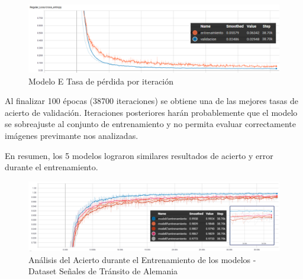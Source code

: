 			\begin{figure}[H]
				\begin{center}
				\includegraphics[width=1\textwidth]{images/desarrollo/trainResults/german/model7Loss} 
				\end{center}
				\begin{center}
				\caption{\small{Modelo E Tasa de pérdida por iteración}}
				
				{\small{\fontsize{10}{16.8}\selectfont {Fuente: Elaboración propia}}}
				\end{center}
				\vspace{-1.5em}
			\end{figure}
		
			Al finalizar 100 épocas (38700 iteraciones) se obtiene una de las mejores tasas de acierto de validación. Iteraciones posteriores harán probablemente que el modelo se sobreajuste al conjunto de entrenamiento y no permita evaluar correctamente imágenes previmante nos analizadas.
		
		\vspace{2em}
		En resumen, los 5 modelos lograron similares resultados de acierto y error durante el entrenamiento.

			\begin{figure}[H]
				\includegraphics[width=1\textwidth, height=\textheight,keepaspectratio]{images/desarrollo/trainResults/germanSummary_entreAcierto} 
				\begin{center}
				\caption{\small{Análisis del Acierto durante el Entrenamiento de los modelos - Dataset Señales de Tránsito de Alemania}}
				
				{\small{\fontsize{10}{16.8}\selectfont {Fuente: Elaboración propia}}}
				\end{center}
				\vspace{-1.5em}
			\end{figure}	

